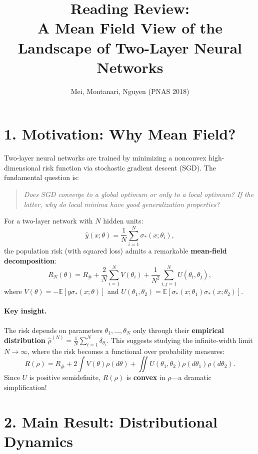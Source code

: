 \documentclass[11pt]{article}
\title{Reading Review:\\A Mean Field View of the Landscape of Two-Layer Neural Networks}
\author{Mei, Montanari, Nguyen (PNAS 2018)}
\date{}
\newcommand{\E}{\mathbb{E}}
\begin{document}
\maketitle

\section*{1. Motivation: Why Mean Field?}

Two-layer neural networks are trained by minimizing a nonconvex high-dimensional risk function via stochastic gradient descent (SGD). The fundamental question is:
\begin{quote}
\emph{Does SGD converge to a global optimum or only to a local optimum? If the latter, why do local minima have good generalization properties?}
\end{quote}

For a two-layer network with $N$ hidden units:
\begin{equation}
\hat{y}(x; \theta) = \frac{1}{N} \sum_{i=1}^N \sigma_*(x; \theta_i),
\end{equation}
the population risk (with squared loss) admits a remarkable \textbf{mean-field decomposition}:
\begin{equation}
R_N(\theta) = R_\# + \frac{2}{N} \sum_{i=1}^N V(\theta_i) + \frac{1}{N^2} \sum_{i,j=1}^N U(\theta_i, \theta_j),
\end{equation}
where $V(\theta) = -\E[y \sigma_*(x; \theta)]$ and $U(\theta_1, \theta_2) = \E[\sigma_*(x; \theta_1)\sigma_*(x; \theta_2)]$.

\paragraph{Key insight.} The risk depends on parameters $\theta_1, \ldots, \theta_N$ only through their \textbf{empirical distribution} $\hat{\rho}^{(N)} = \frac{1}{N}\sum_{i=1}^N \delta_{\theta_i}$. This suggests studying the infinite-width limit $N \to \infty$, where the risk becomes a functional over probability measures:
\begin{equation}
R(\rho) = R_\# + 2 \int V(\theta) \rho(d\theta) + \iint U(\theta_1, \theta_2) \rho(d\theta_1)\rho(d\theta_2).
\end{equation}
Since $U$ is positive semidefinite, $R(\rho)$ is \textbf{convex} in $\rho$—a dramatic simplification!

\section*{2. Main Result: Distributional Dynamics}
\end{document}
